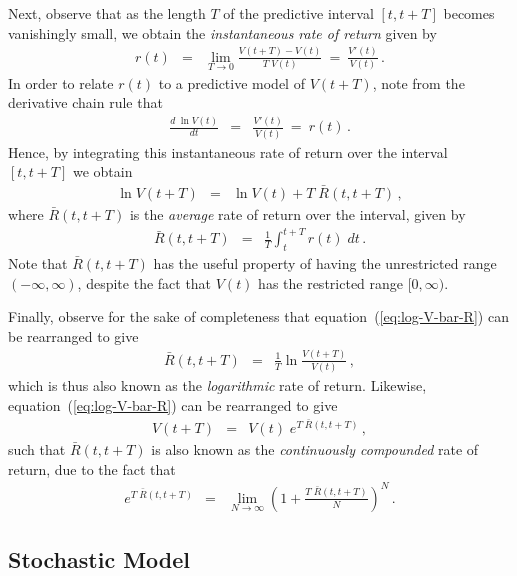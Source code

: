 \documentclass[a4paper]{article}
\begin{document}
Next, observe that as the length $T$ of the predictive interval 
$[t,t+T]$ becomes vanishingly small, we obtain the 
{\em instantaneous rate of return}
given by
\begin{eqnarray}
  r(t) & = & \lim_{T\rightarrow 0}\frac{V(t+T)-V(t)}{T\;V(t)}
 ~=~\frac{V'(t)}{V(t)}\,.
\label{eq:inst-rate-return}
\end{eqnarray}
In order to relate $r(t)$ to a predictive model of $V(t+T)$,
note from the derivative chain rule that 
\begin{eqnarray}
  \frac{d\;\ln V(t)}{dt} & = & \frac{V'(t)}{V(t)}~=~r(t)\,.
\end{eqnarray}
Hence, by integrating this instantaneous rate of return
over the interval $[t,t+T]$ we obtain
\begin{eqnarray}
  \ln V(t+T) & = & \ln V(t) + T\;\bar{R}(t,t+T)\,,
\label{eq:log-V-bar-R}
\end{eqnarray}
where $\bar{R}(t,t+T)$ is the {\em average} rate of return 
over the interval, given by
\begin{eqnarray}
  \bar{R}(t,t+T) & = & \frac{1}{T}\int_{t}^{t+T}r(t)\;dt\,.
\label{eq:bar-R-def}
\end{eqnarray}
Note that $\bar{R}(t,t+T)$ has 
the useful property of
having the unrestricted range $(-\infty,\infty)$, 
despite the fact that $V(t)$ has the restricted range $[0,\infty)$.

Finally, observe for the sake of completeness that
equation~(\ref{eq:log-V-bar-R}) can be rearranged to give
\begin{eqnarray}
  \bar{R}(t,t+T) & = &  \frac{1}{T}\ln\frac{V(t+T)}{V(t)}\,,
\end{eqnarray}
which is thus also known as the {\em logarithmic} rate of return.
Likewise, equation~(\ref{eq:log-V-bar-R}) can be rearranged to give
\begin{eqnarray}
  V(t+T) & = & V(t)\;e^{T\;\bar{R}(t,t+T)}\,,
\end{eqnarray}
such that $\bar{R}(t,t+T)$ 
is also known
as the {\em continuously compounded} rate of return, due to the fact that
\begin{eqnarray}
e^{T\;\bar{R}(t,t+T)} & = & 
\lim_{N\rightarrow\infty}\left(1+\frac{T\;\bar{R}(t,t+T)}{N}\right)^{N}\,.
\end{eqnarray}

\subsection{Stochastic Model}
\end{document}
